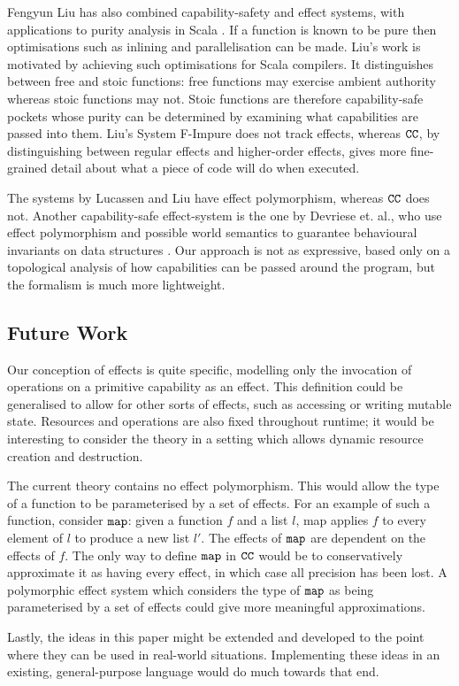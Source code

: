 Fengyun Liu has also combined capability-safety and effect systems, with applications to purity analysis in Scala \cite{liu16}. If a function is known to be pure then optimisations such as inlining and parallelisation can be made. Liu's work is motivated by achieving such optimisations for Scala compilers. It distinguishes between free and stoic functions: free functions may exercise ambient authority whereas stoic functions may not. Stoic functions are therefore capability-safe pockets whose purity can be determined by examining what capabilities are passed into them. Liu's System F-Impure does not track effects, whereas $\mathtt{CC}$, by distinguishing between regular effects and higher-order effects, gives more fine-grained detail about what a piece of code will do when executed.

The systems by Lucassen and Liu have effect polymorphism, whereas $\mathtt{CC}$ does not. Another capability-safe effect-system is the one by Devriese et. al., who use effect polymorphism and possible world semantics to guarantee behavioural invariants on data structures \cite{devriese16}. Our approach is not as expressive, based only on a topological analysis of how capabilities can be passed around the program, but the formalism is much more lightweight.

\subsection{Future Work}

Our conception of effects is quite specific, modelling only the invocation of operations on a primitive capability as an effect. This definition could be generalised to allow for other sorts of effects, such as accessing or writing mutable state. Resources and operations are also fixed throughout runtime; it would be interesting to consider the theory in a setting which allows dynamic resource creation and destruction.

The current theory contains no effect polymorphism. This would allow the type of a function to be parameterised by a set of effects. For an example of such a function, consider $\mathtt{map}$: given a function $f$ and a list $l$, map applies $f$ to every element of $l$ to produce a new list $l'$. The effects of $\mathtt{map}$ are dependent on the effects of $f$. The only way to define $\mathtt{map}$ in $\mathtt{CC}$ would be to conservatively approximate it as having every effect, in which case all precision has been lost. A polymorphic effect system which considers the type of $\mathtt{map}$ as being parameterised by a set of effects could give more meaningful approximations.

Lastly, the ideas in this paper might be extended and developed to the point where they can be used in real-world situations. Implementing these ideas in an existing, general-purpose language would do much towards that end.







